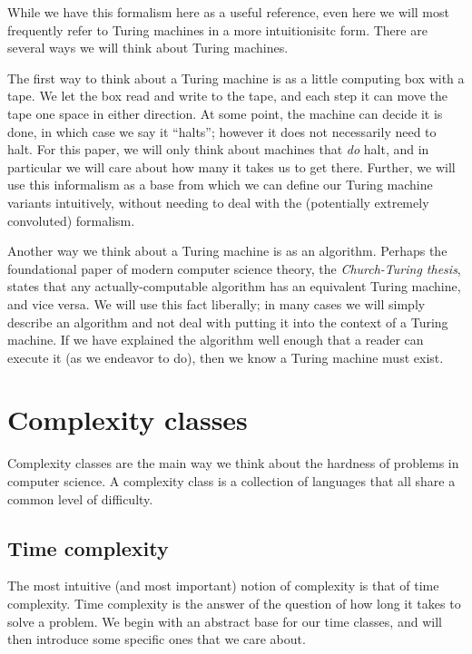 \documentclass{reedthesis}
\theoremstyle{plain}
\theoremstyle{definition}
\theoremstyle{remark}
\numberwithin{equation}{section}
\begin{document}
While we have this formalism here as a useful reference, even here we will most
frequently refer to Turing machines in a more intuitionisitc form. There are
several ways we will think about Turing machines.

The first way to think about a Turing machine is as a little computing box with
a tape. We let the box read and write to the tape, and each step it can move the
tape one space in either direction. At some point, the machine can decide it is
done, in which case we say it ``halts''; however it does not necessarily need to
halt. For this paper, we will only think about machines that \emph{do} halt, and
in particular we will care about how many it takes us to get there. Further, we
will use this informalism as a base from which we can define our Turing machine
variants intuitively, without needing to deal with the (potentially extremely
convoluted) formalism.

Another way we think about a Turing machine is as an algorithm. Perhaps the
foundational paper of modern computer science theory, the \emph{Church-Turing
  thesis}, states that any actually-computable algorithm has an equivalent
Turing machine, and vice versa. We will use this fact liberally; in many cases
we will simply describe an algorithm and not deal with putting it into the
context of a Turing machine. If we have explained the algorithm well enough that
a reader can execute it (as we endeavor to do), then we know a Turing machine
must exist.


\section{Complexity classes}


Complexity classes are the main way we think about the hardness of problems in
computer science. A complexity class is a collection of
languages that all share a common level of difficulty.

\subsection{Time complexity}

The most intuitive (and most important) notion of complexity is that of time
complexity. Time complexity is the answer of the question of how long it takes
to solve a problem. We begin with an abstract base for our time classes, and
will then introduce some specific ones that we care about.
\end{document}
